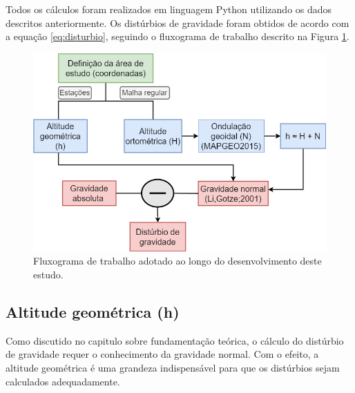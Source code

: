 Todos os cálculos foram realizados em linguagem Python utilizando os dados descritos anteriormente. Os distúrbios de gravidade foram obtidos de acordo com a equação \ref{eq:disturbio}, seguindo o fluxograma de trabalho descrito na Figura \ref{fig:fluxograma}.

\begin{figure}[H]
	\centering
	\includegraphics[scale=0.45]{figs/flux_novo.png}
	\caption{Fluxograma de trabalho adotado ao longo do desenvolvimento deste estudo.}
	\label{fig:fluxograma}
\end{figure} 

\subsection{Altitude geométrica (h)}

Como discutido no capitulo sobre fundamentação teórica, o cálculo do distúrbio de gravidade requer o conhecimento da gravidade normal. Com o efeito, a altitude geométrica é uma grandeza indispensável para que os distúrbios sejam calculados adequadamente.
 
